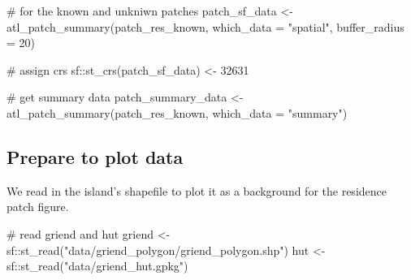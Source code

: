 \documentclass[]{scrreprt}
\newenvironment{Shaded}{}{}
\newcommand{\CommentTok}[1]{\textcolor[rgb]{0.00,0.50,0.00}{#1}}
\newcommand{\DataTypeTok}[1]{#1}
\newcommand{\DecValTok}[1]{#1}
\newcommand{\KeywordTok}[1]{\textcolor[rgb]{0.00,0.00,1.00}{#1}}
\newcommand{\NormalTok}[1]{#1}
\newcommand{\OperatorTok}[1]{#1}
\newcommand{\StringTok}[1]{\textcolor[rgb]{0.00,0.50,0.50}{#1}}
\begin{document}
\begin{Shaded}
\begin{Highlighting}[]
\CommentTok{# for the known and unkniwn patches}
\NormalTok{patch_sf_data <-}\StringTok{ }\KeywordTok{atl_patch_summary}\NormalTok{(patch_res_known, }
                                   \DataTypeTok{which_data =} \StringTok{"spatial"}\NormalTok{,}
                                   \DataTypeTok{buffer_radius =} \DecValTok{20}\NormalTok{)}

\CommentTok{# assign crs}
\NormalTok{sf}\OperatorTok{::}\KeywordTok{st_crs}\NormalTok{(patch_sf_data) <-}\StringTok{ }\DecValTok{32631}

\CommentTok{# get summary data}
\NormalTok{patch_summary_data <-}\StringTok{ }\KeywordTok{atl_patch_summary}\NormalTok{(patch_res_known, }
                                        \DataTypeTok{which_data =} \StringTok{"summary"}\NormalTok{)}
\end{Highlighting}
\end{Shaded}

\hypertarget{prepare-to-plot-data}{%
\subsection{Prepare to plot data}\label{prepare-to-plot-data}}

We read in the island's shapefile to plot it as a background for the residence patch figure.

\begin{Shaded}
\begin{Highlighting}[]
\CommentTok{# read griend and hut}
\NormalTok{griend <-}\StringTok{ }\NormalTok{sf}\OperatorTok{::}\KeywordTok{st_read}\NormalTok{(}\StringTok{"data/griend_polygon/griend_polygon.shp"}\NormalTok{)}
\NormalTok{hut <-}\StringTok{ }\NormalTok{sf}\OperatorTok{::}\KeywordTok{st_read}\NormalTok{(}\StringTok{"data/griend_hut.gpkg"}\NormalTok{)}
\end{Highlighting}
\end{Shaded}
\end{document}
